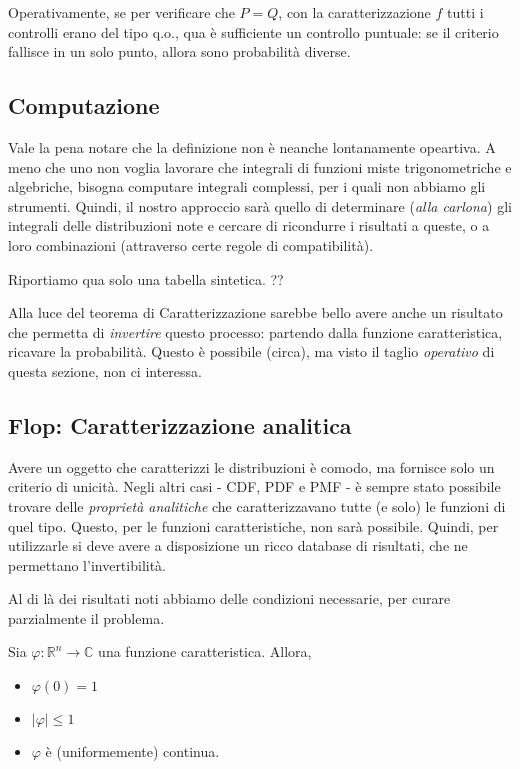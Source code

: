 Operativamente, se per verificare che $P = Q$, con la caratterizzazione $f$ tutti i controlli erano del tipo q.o., qua è sufficiente un controllo puntuale: se il criterio fallisce in un solo punto, allora sono probabilità diverse.

\subsection{Computazione}

Vale la pena notare che la definizione non è neanche lontanamente opeartiva. 
A meno che uno non voglia lavorare che integrali di funzioni miste trigonometriche e algebriche, bisogna computare integrali complessi, per i quali non abbiamo gli strumenti.
Quindi, il nostro approccio sarà quello di determinare (\textit{alla carlona}) gli integrali delle distribuzioni note e cercare di ricondurre i risultati a queste, o a loro combinazioni (attraverso certe regole di compatibilità).

Riportiamo qua solo una tabella sintetica. ??

Alla luce del teorema di Caratterizzazione sarebbe bello avere anche un risultato che permetta di \textit{invertire} questo processo: partendo dalla funzione caratteristica, ricavare la probabilità. Questo è possibile (circa), ma visto il taglio \textit{operativo} di questa sezione, non ci interessa.

\subsection{Flop: Caratterizzazione analitica}

Avere un oggetto che caratterizzi le distribuzioni è comodo, ma fornisce solo un criterio di unicità. 
Negli altri casi - CDF, PDF e PMF - è sempre stato possibile trovare delle \textit{proprietà analitiche} che caratterizzavano tutte (e solo) le funzioni di quel tipo. Questo, per le funzioni caratteristiche, non sarà possibile.
Quindi, per utilizzarle si deve avere a disposizione un ricco database di risultati, che ne permettano l'invertibilità.

Al di là dei risultati noti abbiamo delle condizioni necessarie, per curare parzialmente il problema.

\begin{my_lemma}
	Sia $\varphi:\mathbb{R}^n \to \mathbb{C}$ una funzione caratteristica. Allora,
	\begin{itemize}
		\item $\varphi(0) = 1$
		\item $|\varphi| \leq 1$
		\item $\varphi$ è (uniformemente) continua.
	\end{itemize}
\end{my_lemma}

